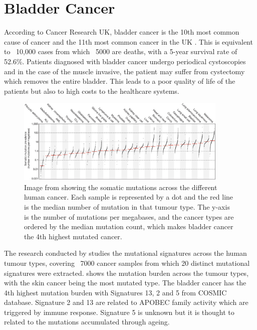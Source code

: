 \section{Bladder Cancer}


According to Cancer Research UK, bladder cancer is the 10th most common cause of cancer and the 11th most common cancer in the UK \cite{Cancer_Research_UK2015-cf}. This is equivalent to ~10,000 cases from which  ~5000 are deaths, with a 5-year survival rate of 52.6\%. Patients diagnosed with bladder cancer undergo periodical cystoscopies and in the case of the muscle invasive, the patient may suffer from cystectomy which removes the entire bladder. This leads to a poor quality of life of the patients but also to high costs to the healthcare systems. 


\begin{figure}[!htb]    
    \centering
\includegraphics[width=0.9\textwidth,height=0.9\textheight,keepaspectratio]{Sections/Lit_review/Resources/mut_sig_cancers.jpg}
    \caption{Image from \cite{Alexandrov2013-gi} showing the somatic mutations across the different human cancer. Each sample is represented by a dot and the red line is the median number of mutation in that tumour type. The y-axis is the number of mutations per megabases, and the cancer types are ordered by the median mutation count, which makes bladder cancer the 4th highest mutated cancer.}
    \label{fig:lit:cancer_mut_sig}
\end{figure}

The research conducted by \citet{Alexandrov2013-gi} studies the mutational signatures across the human tumour types, covering ~7000 cancer samples from which 20 distinct mutational signatures were extracted.  shows the mutation burden across the tumour types, with the skin cancer being the most mutated type. The bladder cancer has the 4th highest mutation burden with Signatures 13, 2 and 5 from COSMIC database\cite{Tate2019-yj}. Signature 2 and 13 are related to APOBEC family activity which are triggered by immune response. Signature 5 is unknown but it is thought to related to the mutations accumulated through ageing. 

